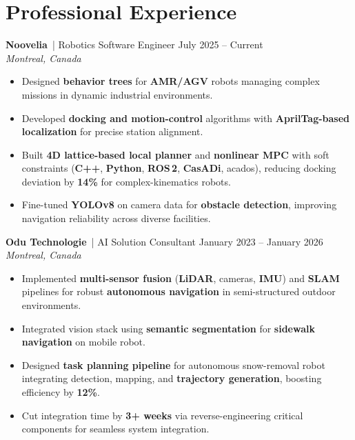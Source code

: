 \documentclass[9.5pt,letterpaper]{article}
\begin{document}
\section*{Professional Experience}
\textbf{Noovelia} \,{| Robotics Software Engineer} \hfill {\small July 2025 -- Current} \\
{\small\textit{Montreal, Canada}}
\begin{itemize}
    \item Designed \textbf{behavior trees} for \textbf{AMR/AGV} robots managing complex missions in dynamic industrial environments.
    \item Developed \textbf{docking and motion-control} algorithms with \textbf{AprilTag-based localization} for precise station alignment.
    \item Built \textbf{4D lattice-based local planner} and \textbf{nonlinear MPC} with soft constraints (\textbf{C++}, \textbf{Python}, \textbf{ROS\,2}, \textbf{CasADi}, acados), reducing docking deviation by \textbf{14\%} for complex-kinematics robots.
    \item Fine-tuned \textbf{YOLOv8} on camera data for \textbf{obstacle detection}, improving navigation reliability across diverse facilities.
\end{itemize}

\vspace{1pt}

\textbf{Odu Technologie} \,{| AI Solution Consultant} \hfill {\small January 2023 -- January 2026} \\
{\small\textit{Montreal, Canada}}
\begin{itemize}
    \item Implemented \textbf{multi-sensor fusion} (\textbf{LiDAR}, cameras, \textbf{IMU}) and \textbf{SLAM} pipelines for robust \textbf{autonomous navigation} in semi-structured outdoor environments.
    \item Integrated vision stack using \textbf{semantic segmentation} for \textbf{sidewalk navigation} on mobile robot.
    \item Designed \textbf{task planning pipeline} for autonomous snow-removal robot integrating detection, mapping, and \textbf{trajectory generation}, boosting efficiency by \textbf{12\%}.
    \item Cut integration time by \textbf{3+ weeks} via reverse-engineering critical components for seamless system integration.
\end{itemize}

\vspace{1pt}
\end{document}
